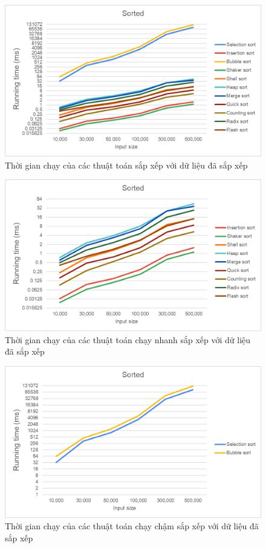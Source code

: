 \begin{figure}[H]
    \centering   
    \includegraphics[width = 0.9\linewidth]{img/experiment/running time/sorted/1.png}
    \caption{Thời gian chạy của các thuật toán sắp xếp với dữ liệu đã sắp xếp}
\end{figure}

\begin{figure}[H]
    \centering   
    \includegraphics[width = 0.9\linewidth]{img/experiment/running time/sorted/2.png}
    \caption{Thời gian chạy của các thuật toán chạy nhanh sắp xếp với dữ liệu đã sắp xếp}     
\end{figure}

\begin{figure}[H]
    \centering   
    \includegraphics[width = 0.9\linewidth]{img/experiment/running time/sorted/3.png}
    \caption{Thời gian chạy của các thuật toán chạy chậm sắp xếp với dữ liệu đã sắp xếp}
\end{figure}

